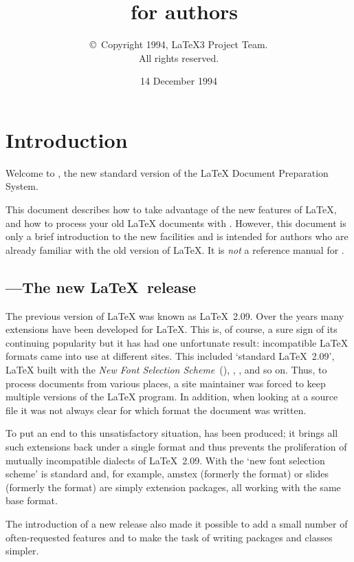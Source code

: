 \documentclass{ltxguide}[1994/11/20]
\title{\LaTeXe~for authors}
\author{\copyright~Copyright 1994, \LaTeX3 Project Team.\\
   All rights reserved.}
\date{14 December 1994}
\begin{document}
 
\maketitle
 
\tableofcontents
 
\section{Introduction}
 
Welcome to \LaTeXe, the new standard version of the \LaTeX{} Document
Preparation System.
 
This document describes how to take advantage of the new features of
\LaTeX, and how to process your old \LaTeX{} documents with
\LaTeXe. However, this document is only a brief introduction to the
new facilities and is intended for authors who are already familiar
with the old version of \LaTeX{}.  It is \emph{not} a reference manual
for \LaTeXe.
 
\subsection{\LaTeXe---The new \LaTeX~release}
 
The previous version of \LaTeX{} was known as \LaTeX~2.09.  Over the
years many extensions have been developed for \LaTeX.  This is, of
course, a sure sign of its continuing popularity but it has had one
unfortunate result: incompatible \LaTeX{} formats came into use at
different sites.  This included `standard \LaTeX~2.09', \LaTeX{} built
with the \emph{New Font Selection Scheme}~(\NFSS), \SLiTeX, \AmSLaTeX,
and so on.  Thus, to process documents from various places, a site
maintainer was forced to keep multiple versions of the \LaTeX{}
program.  In addition, when looking at a source file it was not always
clear for which format the document was written.
 
To put an end to this unsatisfactory situation, \LaTeXe{} has been
produced; it brings all such extensions back under a single format and
thus prevents the proliferation of mutually incompatible dialects of
\LaTeX~2.09.  With \LaTeXe{} the `new font selection scheme' is
standard and, for example, \textsf{amstex} (formerly the \AmSLaTeX{}
format) or \textsf{slides} (formerly the \SLiTeX{} format) are simply
extension packages, all working with the same base format.
 
The introduction of a new release also made it possible to add a small
number of often-requested features and to make the task of writing
packages and classes simpler.
 
\end{document}

